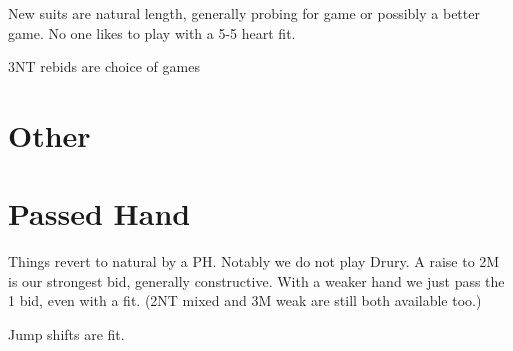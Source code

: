 \documentclass[main]{subfile}
\begin{document}
{	New suits are natural length, generally probing for game or possibly a better game.  No one likes to play  with a 5-5 heart fit.
	
	3NT rebids are choice of games
	 
\section {Other}	

	
\section{Passed Hand}

Things revert to natural by a PH.  Notably we do not play Drury.  A raise to 2M is our strongest bid, generally constructive.  With a weaker hand we just pass the 1 bid, even with a fit.  (2NT mixed and 3M weak are still both available too.)

Jump shifts are fit.

} %
	  
\end{document}
